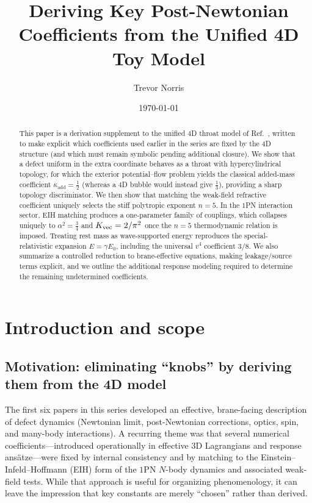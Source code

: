 \documentclass[11pt]{article}
\title{Deriving Key Post-Newtonian Coefficients from the Unified 4D Toy Model}
\author{Trevor Norris}
\date{\today}
\begin{document}
\maketitle

\begin{abstract}
This paper is a derivation supplement to the unified $4$D throat model of Ref.~\cite{norris2026_4d_model}, written to make explicit which coefficients used earlier in the series are fixed by the $4$D structure (and which must remain symbolic pending additional closure). We show that a defect uniform in the extra coordinate behaves as a throat with hypercylindrical topology, for which the exterior potential--flow problem yields the classical added-mass coefficient $\kappa_{\mathrm{add}}=\tfrac12$ (whereas a $4$D bubble would instead give $\tfrac13$), providing a sharp topology discriminator. We then show that matching the weak-field refractive coefficient uniquely selects the stiff polytropic exponent $n=5$. In the $1$PN interaction sector, EIH matching produces a one-parameter family of couplings, which collapses uniquely to $\alpha^2=\tfrac34$ and $K_{\rm vec}=2/\pi^2$ once the $n=5$ thermodynamic relation is imposed. Treating rest mass as wave-supported energy reproduces the special-relativistic expansion $E=\gamma E_0$, including the universal $v^4$ coefficient $3/8$. We also summarize a controlled reduction to brane-effective equations, making leakage/source terms explicit, and we outline the additional response modeling required to determine the remaining undetermined coefficients.
\end{abstract}

\section{Introduction and scope}
\label{sec:intro}

\subsection{Motivation: eliminating ``knobs'' by deriving them from the 4D model}

The first six papers in this series developed an effective, brane-facing description of defect
dynamics (Newtonian limit, post-Newtonian corrections, optics, spin, and many-body interactions).
A recurring theme was that several numerical coefficients---introduced operationally in effective
$3$D Lagrangians and response ans\"atze---were fixed by internal consistency and by matching to
the Einstein--Infeld--Hoffmann (EIH) form of the $1$PN $N$-body dynamics and associated weak-field
tests. While that approach is useful for organizing phenomenology, it can leave the impression
that key constants are merely ``chosen'' rather than derived.
\end{document}
